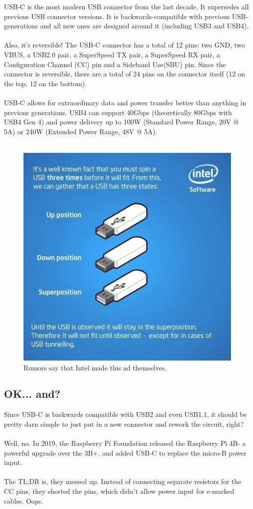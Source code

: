 \documentclass[12pt]{article}
\begin{document}
USB-C is the most modern USB connector from the last decade. It supersedes all previous USB connector versions. It is backwards-compatible with previous USB-generations and all new ones are designed around it (including USB3 and USB4). \\\\
\noindent
Also, it's reversible! The USB-C connector has a total of 12 pins: two GND, two VBUS, a USB2.0 pair, a SuperSpeed TX pair, a SuperSpeed RX pair, a Configuration Channel (CC) pin and a Sideband Use(SBU) pin. Since the connector is reversible, there are a total of 24 pins on the connector itself (12 on the top, 12 on the bottom). \\\\
\noindent
USB-C allows for extraordinary data and power transfer better than anything in previous generations. USB4 can support 40Gbps (theoretically 80Gbps with USB4 Gen 4) and power delivery up to 100W (Standard Power Range, 20V @ 5A) or 240W (Extended Power Range, 48V @ 5A).  \\\\
\begin{figure}[h]
	\centering
	\includegraphics[width=0.6\linewidth]{images/intel.jpg}
	\caption{Rumors say that Intel made this ad themselves.}
	\captionsetup{justification=raggedright,singlelinecheck=false}
	\label{fig:usbSuperposition}
\end{figure}


\subsection{OK... and?}
Since USB-C is backwards compatible with USB2 and even USB1.1, it should be pretty darn simple to just put in a new connector and rework the circuit, right?\\\\
\noindent
Well, no. In 2019, the Raspberry Pi Foundation released the Raspberry Pi 4B- a powerful upgrade over the 3B+, and added USB-C to replace the micro-B power input. \\\\
\noindent
The TL;DR is, they messed up. Instead of connecting separate resistors for the CC pins, they shorted the pins, which didn't allow power input for e-marked cables. Oops. 
\end{document}
